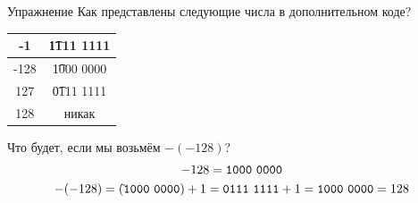 \begin{frame}{Упражнение}
	Как представлены следующие числа в дополнительном коде?

	\begin{center}
		\pause
		\begin{tabular}{|c|c|}
			\hline
			-1 & \pause \t{1111 1111} \\\hline\noalign{\pause}
			-128 & \pause \t{1000 0000} \\\hline\noalign{\pause}
			127 & \pause \t{0111 1111} \\\hline\noalign{\pause}
			128 & \pause никак \\
			\hline
		\end{tabular}
		\pause
	\end{center}
	Что будет, если мы возьмём $-(-128)$? \pause
	\begin{gather*}
		-128=\t{1000~0000} \\
		-(-128)=(\tilde{}\t{1000~0000})+1 = \t{0111~1111}+1 = \t{1000~0000} = 128 \\
	\end{gather*}
\end{frame}
